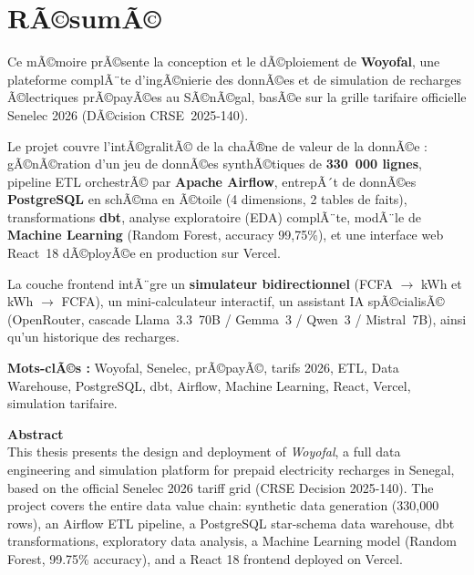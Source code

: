 \documentclass[12pt,a4paper]{report}
\begin{document}
\chapter*{RÃ©sumÃ©}

Ce mÃ©moire prÃ©sente la conception et le dÃ©ploiement de \textbf{Woyofal}, une plateforme complÃ¨te d'ingÃ©nierie des donnÃ©es et de simulation de recharges Ã©lectriques prÃ©payÃ©es au SÃ©nÃ©gal, basÃ©e sur la grille tarifaire officielle Senelec 2026 (DÃ©cision CRSE~2025-140).

Le projet couvre l'intÃ©gralitÃ© de la chaÃ®ne de valeur de la donnÃ©e : gÃ©nÃ©ration d'un jeu de donnÃ©es synthÃ©tiques de \textbf{330~000 lignes}, pipeline ETL orchestrÃ© par \textbf{Apache Airflow}, entrepÃ´t de donnÃ©es \textbf{PostgreSQL} en schÃ©ma en Ã©toile (4 dimensions, 2 tables de faits), transformations \textbf{dbt}, analyse exploratoire (EDA) complÃ¨te, modÃ¨le de \textbf{Machine Learning} (Random Forest, accuracy 99,75\%), et une interface web React~18 dÃ©ployÃ©e en production sur Vercel.

La couche frontend intÃ¨gre un \textbf{simulateur bidirectionnel} (FCFA $\rightarrow$ kWh et kWh $\rightarrow$ FCFA), un mini-calculateur interactif, un assistant IA spÃ©cialisÃ© (OpenRouter, cascade Llama~3.3~70B / Gemma~3 / Qwen~3 / Mistral~7B), ainsi qu'un historique des recharges.

\textbf{Mots-clÃ©s :} Woyofal, Senelec, prÃ©payÃ©, tarifs 2026, ETL, Data Warehouse, PostgreSQL, dbt, Airflow, Machine Learning, React, Vercel, simulation tarifaire.

\vspace{1cm}
\textbf{Abstract} \\[4pt]
This thesis presents the design and deployment of \textit{Woyofal}, a full data engineering and simulation platform for prepaid electricity recharges in Senegal, based on the official Senelec 2026 tariff grid (CRSE Decision 2025-140). The project covers the entire data value chain: synthetic data generation (330,000 rows), an Airflow ETL pipeline, a PostgreSQL star-schema data warehouse, dbt transformations, exploratory data analysis, a Machine Learning model (Random Forest, 99.75\% accuracy), and a React 18 frontend deployed on Vercel.

\newpage

\tableofcontents
\newpage
\end{document}
